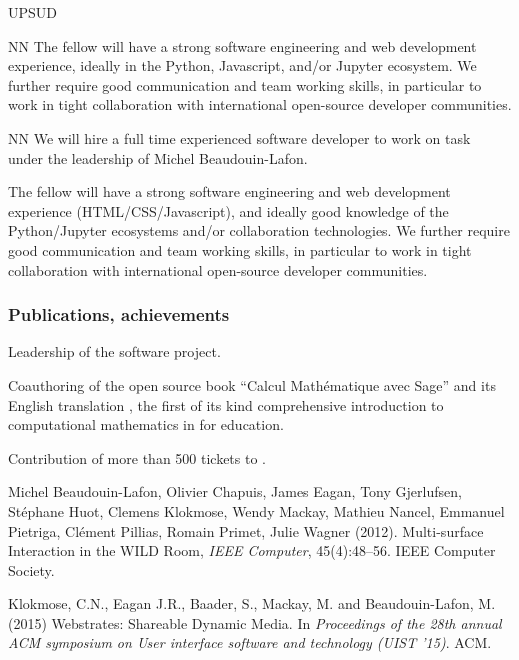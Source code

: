 \begin{sitedescription}{UPSUD}
\begin{participant}[type=res,PM=21]{NN}
  The fellow will have a strong software engineering and web
  development experience, ideally in the Python, Javascript, and/or
  Jupyter ecosystem. We further require good communication and team
  working skills, in particular to work in tight collaboration with
  international open-source developer communities.
\end{participant}

\begin{participant}[type=res,PM=12]{NN}
  We will hire a full time experienced software developer to work
  on task~ %
  under the leadership of Michel Beaudouin-Lafon.

  The fellow will have a strong software engineering and web
  development experience (HTML/CSS/Javascript), and ideally 
  good knowledge of the Python/Jupyter ecosystems
  and/or collaboration technologies. 
  We further require good communication and team
  working skills, in particular to work in tight collaboration with
  international open-source developer communities.
\end{participant}


\subsubsection*{Publications, achievements}

\begin{compactenum}
\item Leadership of the \SageCombinat software project.
\item Coauthoring of the open source book ``Calcul Mathématique avec
  Sage'' and its English translation , the first of its kind
  comprehensive introduction to computational mathematics in \Sage for
  education.
\item Contribution of more than 500 tickets to \Sage.
\item
Michel Beaudouin-Lafon, Olivier Chapuis, James Eagan, Tony Gjerlufsen, Stéphane Huot, Clemens Klokmose, Wendy Mackay, Mathieu Nancel, Emmanuel Pietriga, Clément Pillias, Romain Primet, Julie Wagner (2012). Multi-surface Interaction in the WILD Room, \emph{IEEE Computer}, 45(4):48–56. IEEE Computer Society.
\item
Klokmose, C.N., Eagan J.R., Baader, S., Mackay, M. and Beaudouin-Lafon, M. (2015) Webstrates: Shareable Dynamic Media. In \emph{Proceedings of the 28th annual ACM symposium on User interface software and technology (UIST ’15)}. ACM.
\end{compactenum}


\end{sitedescription}
